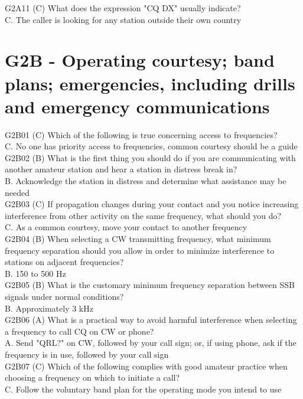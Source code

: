 \documentclass[12pt,letterpaper]{report}
\begin{document}
G2A11 (C) What does the expression "CQ DX" usually indicate?\\
C. The caller is looking for any station outside their own country\\

\section{G2B - Operating courtesy; band plans; emergencies, including drills and emergency communications}

G2B01 (C) Which of the following is true concerning access to frequencies?\\
C. No one has priority access to frequencies, common courtesy should be a guide\\

G2B02 (B) What is the first thing you should do if you are communicating with another amateur station and hear a station in distress break in?\\
B. Acknowledge the station in distress and determine what assistance may be needed\\

G2B03 (C) If propagation changes during your contact and you notice increasing interference from other activity on the same frequency, what should you do?\\
C. As a common courtesy, move your contact to another frequency \\

G2B04 (B) When selecting a CW transmitting frequency, what minimum frequency separation should you allow in order to minimize interference to stations on adjacent frequencies?\\
B. 150 to 500 Hz \\

G2B05 (B) What is the customary minimum frequency separation between SSB signals under normal conditions?\\
B. Approximately 3 kHz \\

G2B06 (A) What is a practical way to avoid harmful interference when selecting a frequency to call CQ on CW or phone?\\
A. Send "QRL?" on CW, followed by your call sign; or, if using phone, ask if the frequency is in use, followed by your call sign\\

G2B07 (C) Which of the following complies with good amateur practice when choosing a frequency on which to initiate a call?\\
C. Follow the voluntary band plan for the operating mode you intend to use\\
\end{document}
